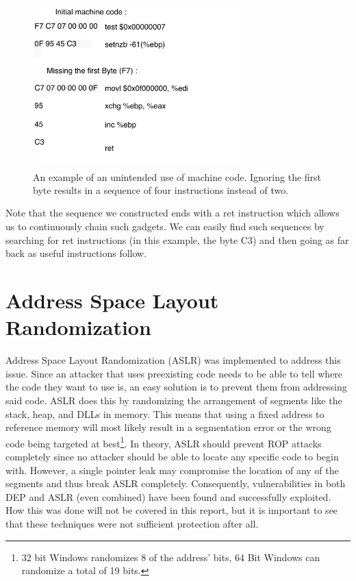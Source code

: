 \documentclass[10pt,twocolumn,a4paper]{article}
\begin{document}
\begin{figure}[h]
  \includegraphics[keepaspectratio,width=8cm]{fig/ByteCode}
  \caption{An example of an unintended use of machine code\textsuperscript{\cite{geometry}}. Ignoring the first byte results in a sequence of four instructions instead of two.}
\end{figure}\newline
Note that the sequence we constructed ends with a ret instruction which allows us to continuously chain such gadgets.
We can easily find such sequences by searching for ret instructions (in this example, the byte C3) and then going as far back as useful instructions follow\cite{gadgets}.

\section{Address Space Layout Randomization}\label{sec:ASLR}
Address Space Layout Randomization (ASLR) was implemented to address this issue.
Since an attacker that uses preexisting code needs to be able to tell where the code they want to use is, an easy solution is to prevent them from addressing said code.
ASLR does this by randomizing the arrangement of segments like the stack, heap, and DLLs in memory. This means that using a fixed address to reference memory will most likely result in a segmentation error or the wrong code being targeted at best\footnote{32 bit Windows randomizes 8 of the address' bits, 64 Bit Windows can randomize a total of 19 bits.}. 
In theory, ASLR should prevent ROP attacks completely since no attacker should be able to locate any specific code to begin with.
However, a single pointer leak may compromise the location of any of the segments and thus break ASLR completely.
Consequently, vulnerabilities in both DEP and ASLR (even combined) have been found and successfully exploited\cite{bypass}.
How this was done will not be covered in this report, but it is important to see that these techniques were not sufficient protection after all.
\end{document}
